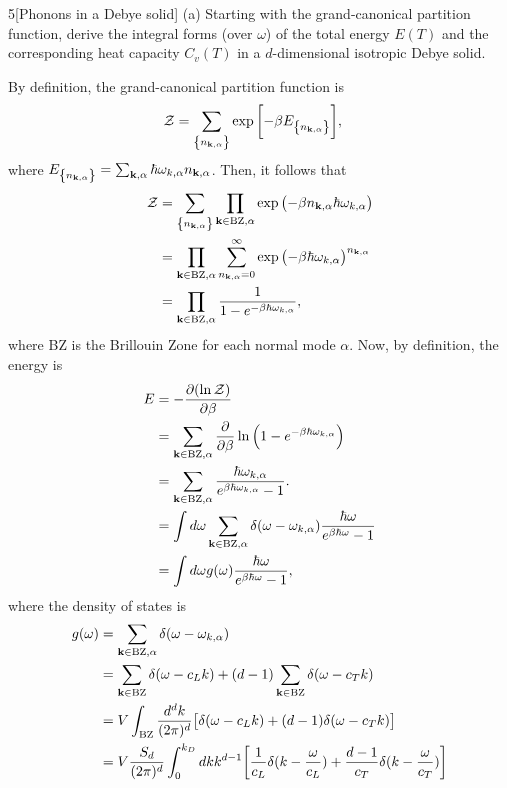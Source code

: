 \documentclass[12pt]{article}
\begin{document}
\begin{problem}{5}[Phonons in a Debye solid]
(a) Starting with the grand-canonical partition function, derive the integral
forms (over $\omega$) of the total energy $E(T)$ and the corresponding heat
capacity $C_v(T)$ in a $d$-dimensional isotropic Debye solid.
\begin{solution}
By definition, the grand-canonical partition function is
\begin{align}
    \mathcal{Z}&=\sum_\qty{n_{\vb{k},\alpha}}\exp\qty[-\beta E_\qty{n_{\vb{k},\alpha}}],
\end{align}
where
$E_\qty{n_{\vb{k},\alpha}}=\sum_{\vb{k},\alpha}\hbar\omega_{k,\alpha}n_{\vb{k},\alpha}$. Then, it follows that
\begin{align}
    \mathcal{Z}
    &=\sum_\qty{n_{\vb{k},\alpha}}\prod_{\vb{k}\in\text{BZ},\alpha}
    \exp\qty(-\beta n_{\vb{k},\alpha}\hbar\omega_{k,\alpha})\notag\\
    &=\prod_{\vb{k}\in\text{BZ},\alpha}\sum_{n_{\vb{k},\alpha}=0}^\infty
    \exp\qty(-\beta\hbar\omega_{k,\alpha})^{n_{\vb{k},\alpha}}\notag\\
    &=\prod_{\vb{k}\in\text{BZ},\alpha}\frac{1}{1-e^{-\beta\hbar\omega_{k,\alpha}}},
\end{align}
where BZ is the Brillouin Zone for each normal mode $\alpha$. Now, by 
definition, the energy is
\begin{align}
    E
    &=-\frac{\partial(\ln\mathcal{Z})}{\partial\beta}\notag\\
    &=\sum_{\vb{k}\in\text{BZ},\alpha}\frac{\partial}{\partial\beta}\ln\qty(1-e^{-\beta\hbar\omega_{k,\alpha}})\notag\\
    &=\sum_{\vb{k}\in\text{BZ},\alpha}\frac{\hbar\omega_{k,\alpha}}{e^{\beta\hbar\omega_{k,\alpha}}-1}.\notag\\
    &=\int
    d\omega\sum_{\vb{k}\in\text{BZ},\alpha}\delta(\omega-\omega_{k,\alpha})\frac{\hbar\omega}{e^{\beta\hbar\omega}-1}\notag\\
    &=\int d\omega g(\omega)\frac{\hbar\omega}{e^{\beta\hbar\omega}-1},
\end{align}
where the density of states is
\begin{align}
    g(\omega)
    &=\sum_{\vb{k}\in\t{BZ},\alpha}\delta(\omega-\omega_{k,\alpha}) \notag\\
    &=\sum_{\vb{k}\in\t{BZ}}\delta(\omega-c_Lk)+(d-1)\sum_{\vb{k}\in\t{BZ}}\delta(\omega-c_Tk)\notag\\
    &=V\int_\t{BZ}\frac{d^dk}{(2\pi)^d}\qty[\delta(\omega-c_Lk)+(d-1)\delta(\omega-c_Tk)]\notag\\
    &=V\frac{S_d}{(2\pi)^d}\int_0^{k_D}dkk^{d-1}\qty[\frac1{c_L}\delta(k-\frac{\omega}{c_L})+\frac{d-1}{c_T}\delta(k-\frac{\omega}{c_T})]\notag\\

\end{align}
\end{solution}
\end{problem}
\end{document}
